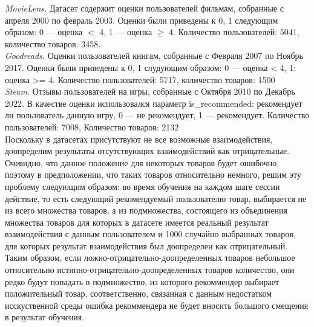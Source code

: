 \documentclass{mipt-thesis-ms}
\renewcommand{\geq}{\geqslant}  %
\begin{document}
{\it MovieLens.} Датасет содержит оценки пользователей фильмам, собранные с апреля 2000 по февраль 2003. Оценки были приведены к {0, 1} следующим образом: 0 --- оценка $<$ 4, 1 --- оценка $\geq$ 4. Количество пользователей: 5041, количество товаров: 3458.\\

{\it Goodreads.} Оценки пользователей книгам, собранные с Февраля 2007 по
Ноябрь 2017. Оценки были приведены к {0, 1} слудующим образом: 0 --- оценка < 4, 1: оценка >= 4. Количество пользователей: 5717, количество товаров: 1500\\

{\it Steam.} Отзывы пользователей на игры, собранные с Октября 2010 по
Декабрь 2022. В качестве оценки использовался параметр is\_recommended: рекомендует ли пользователь данную игру, 0 --- не рекомендует, 1 --- рекомендует. Количество пользователей: 7008, Количество товаров: 2132\\

Поскольку в датасетах присутствуют не все возможные взаимодействия, доопределим результаты отсутствующих взаимодействий как отрицательные. Очевидно, что данное положение для некоторых товаров будет ошибочно, поэтому в предположении, что таких товаров относительно немного, решим эту проблему следующим образом: во время обучения на каждом шаге сессии действие, то есть следующий рекомендуемый пользователю товар, выбирается не из всего множества товаров, а из подмножества, состоящего из объединения множества товаров для которых в датасете имеется реальный результат взаимодействия с данным пользователем и 1000 случайно выбранных товаров, для которых результат взаимодействия был доопределен как отрицательный. Таким образом, если ложно-отрицательно-доопределенных товаров небольшое относительно истинно-отрицательно-доопределенных товаров количество, они редко будут попадать в подмножество, из которого рекоммендер выбирает положительный товар, соответственно, связанная с данным недостатком исскуственной среды ошибка рекоммендера не будет вносить большого смещения в результат обучения.\\
\end{document}
